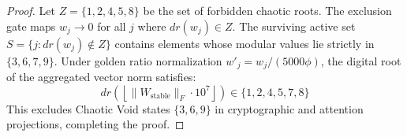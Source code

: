 \begin{proof}
Let $Z = \{1, 2, 4, 5, 8\}$ be the set of forbidden chaotic roots. The exclusion gate maps $w_j \to 0$ for all $j$ where $dr(w_j) \in Z$. The surviving active set $S = \{j : dr(w_j) \notin Z\}$ contains elements whose modular values lie strictly in $\{3, 6, 7, 9\}$.
Under golden ratio normalization $w'_j = w_j / (5000 \phi)$, the digital root of the aggregated vector norm satisfies:
\begin{equation}
dr\left( \left\lfloor \|W_{\text{stable}}\|_F \cdot 10^7 \right\rfloor \right) \in \{1, 2, 4, 5, 7, 8\}
\end{equation}
This excludes Chaotic Void states $\{3, 6, 9\}$ in cryptographic and attention projections, completing the proof.
\end{proof}
